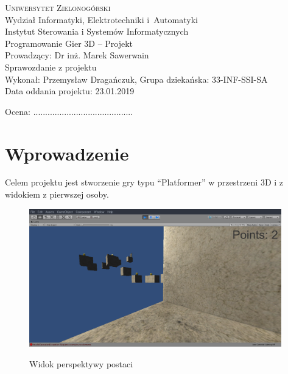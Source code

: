 \documentclass[10pt,a4paper]{article}
\begin{document}
\pagestyle{empty}

\begin{center}
\textsc{\Huge{Uniwersytet Zielonogórski}}\\
\LARGE{Wydział Informatyki, Elektrotechniki i~Automatyki}\\
\large{Instytut Sterowania i Systemów Informatycznych}\\
\vspace{0.5cm}
\Large{Programowanie Gier 3D -- Projekt}\\
Prowadzący: Dr inż. Marek Sawerwain \\ \vspace{1cm}
\LARGE{Sprawozdanie z projektu}\\

\vspace{0.5cm}
\Large{Wykonał: Przemysław Dragańczuk, Grupa dziekańska: 33-INF-SSI-SA} \\

\Large{Data oddania projektu: 23.01.2019}
\vspace{1cm}

\begin{flushleft}
	Ocena: ..........................................
\end{flushleft}

\vspace{1cm}
\end{center}



%
%

\begin{multicols}{2}
	\footnotesize
	\tableofcontents
\end{multicols}

\noindent\makebox[\linewidth]{\rule{0.6\paperwidth}{0.4pt}}

\section{Wprowadzenie}
\label{sec:wprowadzenie}

Celem projektu jest stworzenie gry typu ``Platformer'' w przestrzeni 3D
i z widokiem z pierwszej osoby.

\begin{figure}[hb]
	\centering
	\includegraphics[height=6cm]{screens/lvl.png}
	\label{fig:screen-lvl}
	\caption{Widok perspektywy postaci}
\end{figure}
\end{document}
